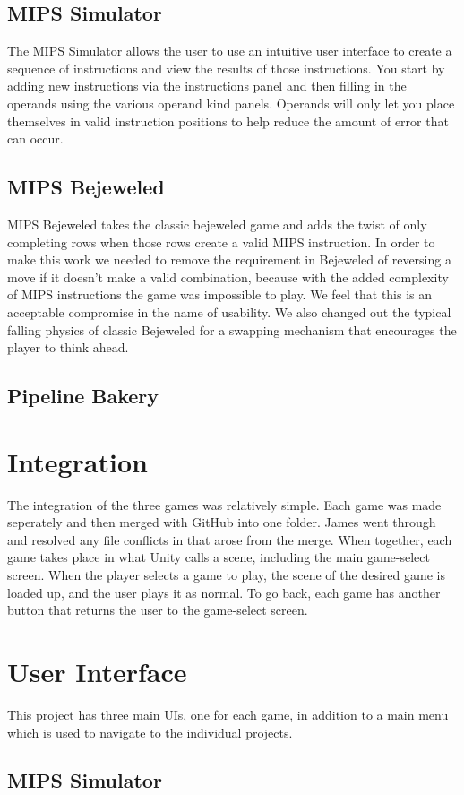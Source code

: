 \documentclass[12pt]{article}
\begin{document}
	\subsection{MIPS Simulator}
	The MIPS Simulator allows the user to use an intuitive user interface to create a sequence of instructions and view the results of those instructions. You start by adding new instructions via the instructions panel and then filling in the operands using the various operand kind panels. Operands will only let you place themselves in valid instruction positions to help reduce the amount of error that can occur.
	\subsection{MIPS Bejeweled}
	MIPS Bejeweled takes the classic bejeweled game and adds the twist of only completing rows when those rows create a valid MIPS instruction. In order to make this work we needed to remove the requirement in Bejeweled of reversing a move if it doesn't make a valid combination, because with the added complexity of MIPS instructions the game was impossible to play. We feel that this is an acceptable compromise in the name of usability. We also changed out the typical falling physics of classic Bejeweled for a swapping mechanism that encourages the player to think ahead.
	\subsection{Pipeline Bakery}
	\section{Integration}
	The integration of the three games was relatively simple. Each game was made seperately and then merged with GitHub into one folder. James went through and resolved any file conflicts in that arose from the merge. When together, each game takes place in what Unity calls a scene, including the main game-select screen. When the player selects a game to play, the scene of the desired game is loaded up, and the user plays it as normal. To go back, each game has another button that returns the user to the game-select screen.
	\section{User Interface}
	This project has three main UIs, one for each game, in addition to a main menu which is used to navigate to the individual projects.
	\subsection{MIPS Simulator}
\end{document}
